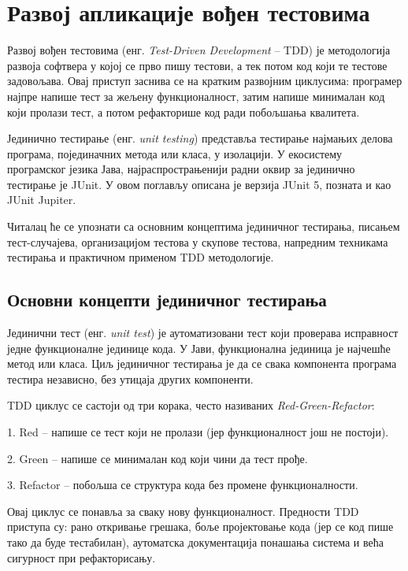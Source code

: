 \setlength{\parindent}{15pt}
\setlength{\parskip}{0pt}
\chapter{Развој апликације вођен тестовима}

Развој вођен тестовима (енг. \textit{Test-Driven Development} – TDD) је методологија развоја софтвера у којој се прво пишу тестови, а тек потом код који те тестове задовољава. Овај приступ заснива се на кратким развојним циклусима: програмер најпре напише тест за жељену функционалност, затим напише минималан код који пролази тест, а потом рефакторише код ради побољшања квалитета.

Јединично тестирање (енг. \textit{unit testing}) представља тестирање најмањих делова програма, појединачних метода или класа, у изолацији. У екосистему програмског језика Јава, најраспрострањенији радни оквир за јединично тестирање је JUnit. У овом поглављу описана је верзија JUnit 5, позната и као JUnit Jupiter.

Читалац ће се упознати са основним концептима јединичног тестирања, писањем тест-случајева, организацијом тестова у скупове тестова, напредним техникама тестирања и практичном применом TDD методологије.


\section{Основни концепти јединичног тестирања}

Јединични тест (енг. \textit{unit test}) је аутоматизовани тест који проверава исправност једне функционалне јединице кода. У Јави, функционална јединица је најчешће метод или класа. Циљ јединичног тестирања је да се свака компонента програма тестира независно, без утицаја других компоненти.

TDD циклус се састоји од три корака, често називаних \textit{Red-Green-Refactor}:

1. Red – напише се тест који не пролази (јер функционалност још не постоји).

2. Green – напише се минималан код који чини да тест прође.

3. Refactor – побољша се структура кода без промене функционалности.

Овај циклус се понавља за сваку нову функционалност. Предности TDD приступа су: рано откривање грешака, боље пројектовање кода (јер се код пише тако да буде тестабилан), аутоматска документација понашања система и већа сигурност при рефакторисању.


